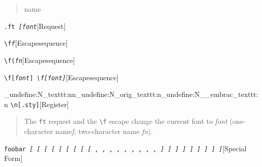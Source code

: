 \documentclass{book}
\begin{document}
%
\begin{quote}
name
\end{quote}

\noindent\texttt{\texttt{.ft} \EmbracOn{}\textnormal{\textsl{[\EmbracOff{}\textnormal{\textsl{font}}\EmbracOn{}{]}}}\EmbracOff{}}\hfill[Request]



%
\noindent\texttt{\texttt{\textbackslash{}f}\textnormal{\textsl{f}}\texttt{}}\hfill[Escape\hbox{}sequence]



%
\noindent\texttt{\texttt{\textbackslash{}f(}\textnormal{\textsl{fn}}\texttt{}}\hfill[Escape\hbox{}sequence]



%
\noindent\texttt{\texttt{\textbackslash{}f[}\textnormal{\textsl{font}}\texttt{{]}} \EmbracOn{}\textnormal{\textsl{\texttt{\textbackslash{}f[}\EmbracOff{}\textnormal{\textsl{font}}\EmbracOn{}\texttt{{]}}}}\EmbracOff{}}\hfill[Escape\hbox{}sequence]


\ExplSyntaxOn%
\cs_undefine:N{\embrac_texttt:nn}\cs_undefine:N{\embrac_orig_texttt:n}\cs_undefine:N{\__embrac_texttt:n}%
\ExplSyntaxOff%
%
\noindent\texttt{\texttt{\textbackslash{}n[.sty{]}}}\hfill[Register]



%
\begin{quote}
The \texttt{ft} request and the \texttt{\textbackslash{}f} escape change the current font
to \textsl{font} (one-character name\hbox{}\textsl{f}, two-character name
\textsl{fn}).
\end{quote}

\noindent\texttt{foobar \EmbracOn{}\textnormal{\textsl{[ \EmbracOff{}\textnormal{[}\EmbracOn{} \textsl{[} \texttt{[} \texttt{[} \EmbracOff{}\textnormal{\textsl{[}}\EmbracOn{} \EmbracOff{}\textnormal{\texttt{[}}\EmbracOn{} \EmbracOff{}\textnormal{\texttt{\textsl{[}}}\EmbracOn{} \EmbracOff{}\textnormal{\texttt{[}}\EmbracOn{} , \EmbracOff{}\textnormal{,}\EmbracOn{} \textsl{,} \texttt{,} \texttt{,} \EmbracOff{}\textnormal{\textsl{,}}\EmbracOn{} \EmbracOff{}\textnormal{\texttt{,}}\EmbracOn{} \EmbracOff{}\textnormal{\texttt{\textsl{,}}}\EmbracOn{} \EmbracOff{}\textnormal{\texttt{,}}\EmbracOn{} {]} \EmbracOff{}\textnormal{{]}}\EmbracOn{} \textsl{{]}} \texttt{{]}} \texttt{{]}} \EmbracOff{}\textnormal{\textsl{{]}}}\EmbracOn{} \EmbracOff{}\textnormal{\texttt{{]}}}\EmbracOn{} \EmbracOff{}\textnormal{\texttt{\textsl{{]}}}}\EmbracOn{} \EmbracOff{}\textnormal{\texttt{{]}}}\EmbracOn{}}}\EmbracOff{}}\hfill[Special Form]
\end{document}
